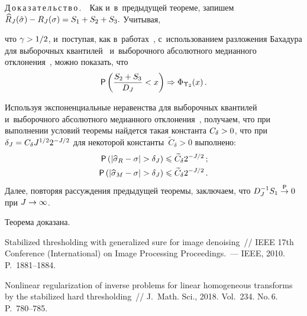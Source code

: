\begin{multicols}{2}
\noindent
Д\,о\,к\,а\,з\,а\,т\,е\,л\,ь\,с\,т\,в\,о\,.\ \
Как и~в~предыдущей теореме, запишем
$\widehat{R}_J(\hat{\sigma})\hm-R_J(\sigma)\hm=S_1\hm+S_2\hm+S_3.$
Учитывая,\linebreak\vspace*{-12pt}

\pagebreak

\noindent
 что $\gamma\hm>1/2$, и~поступая, как в~работах~\cite{SH18, KS11-2, SH12}, 
с~использованием разложения Бахадура для выборочных квантилей~\cite{S80} и~выборочного 
абсолютного медианного отклонения~\cite{SM09}, можно показать, что
\begin{equation*}
{\sf P}\left(\fr{S_2+S_3}{D_J}<x\right)\Rightarrow\Phi_{\Upsilon_2}(x)\,. %
\end{equation*}

Используя экспоненциальные неравенства для выборочных квантилей~\cite{S80} 
и~выборочного абсолютного медианного отклонения~\cite{SM09}, получаем, что при 
выполнении условий теоремы найдется такая константа $C_\delta\hm>0$, что при 
$\delta_J\hm=C_\delta J^{1/2}2^{-J/2}$ для некоторой константы~$\widetilde{C}_\delta>0$ 
выполнено:
\begin{align*}
\mathsf{P}\left(\abs{\widehat{\sigma}_{R}-\sigma}>\delta_J\right)
&\leqslant\widetilde{C}_\delta2^{-J/2}\,;
\\
\mathsf{P}\left(\abs{\widehat{\sigma}_{M}-\sigma}>\delta_J\right)
&\leqslant\widetilde{C}_\delta2^{-J/2}\,. %
\end{align*}
Далее, повторяя рассуждения предыдущей теоремы, заключаем, что 
$D_J^{-1}S_1\stackrel{{\sf P}}{\to}0$ при $J\hm\rightarrow\infty$.


Теорема доказана.



{\small\frenchspacing
 {%
 \begin{thebibliography}{99}

Stabilized thresholding with generalized sure for image denoising~// 
IEEE 17th  Conference (International) on Image Processing
Proceedings.~--- IEEE, 2010. P.~1881--1884.

Nonlinear regularization of inverse problems for linear homogeneous transforms 
by the stabilized hard thresholding~// J.~Math. Sci., 2018. Vol.~234. No.\,6. P.~780--785.


\end{thebibliography}}}
\end{multicols}
